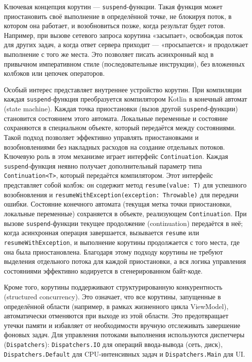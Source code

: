 Ключевая концепция корутин — \texttt{suspend}-функции. Такая функция может приостановить своё выполнение в определённой точке, не блокируя поток, в котором она работает, и возобновиться позже, когда результат будет готов. Например, при вызове сетевого запроса корутина «засыпает», освобождая поток для других задач, а когда ответ сервера приходит — «просыпается» и продолжает выполнение с того же места. Это позволяет писать асинхронный код в привычном императивном стиле (последовательные инструкции), без вложенных колбэков или цепочек операторов.

Особый интерес представляет внутреннее устройство корутин. При компиляции каждая \texttt{suspend}-функция преобразуется компилятором Kotlin в конечный автомат (state machine). Каждая точка приостановки (вызов другой \texttt{suspend}-функции) становится состоянием этого автомата. Локальные переменные и состояние сохраняются в специальном объекте, который передаётся между состояниями. Такой подход позволяет эффективно управлять приостановками и возобновлениями без накладных расходов на создание отдельных потоков. Ключевую роль в этом механизме играет интерфейс \texttt{Continuation}. Каждая \texttt{suspend}-функция неявно получает дополнительный параметр типа \texttt{Continuation<T>}, который передаётся компилятором. Этот интерфейс представляет собой колбэк: он содержит метод \texttt{resume(value: T)} для успешного возобновления и \texttt{resumeWithException(exception: Throwable)} для передачи ошибки. Состояние конечного автомата (текущая метка точки приостановки, локальные переменные) сохраняется в объекте, реализующем \texttt{Continuation}. При вызове \texttt{suspend}-функции текущее продолжение (continuation) передаётся в неё; когда асинхронная операция завершается, вызывается \texttt{resume} или \texttt{resumeWithException}, и выполнение корутины продолжается с того места, где она была приостановлена. Благодаря этому подходу корутины не требуют выделения отдельного потока для каждой приостановки, а вся логика управления состояниями эффективно кодируется в сгенерированном байт-коде.

Кроме того, корутины поддерживают структурированную конкурентность (structured concurrency). Это означает, что все корутины, запущенные в определённой области (например, в рамках жизненного цикла ViewModel), автоматически отменяются при выходе из этой области. Это предотвращает утечки памяти и избавляет от необходимости вручную отслеживать завершение фоновых задач. Для управления потоками выполнения используются диспетчеры (\texttt{Dispatchers}): \texttt{Dispatchers.IO} для операций ввода-вывода (сеть, диск), \texttt{Dispatchers.Default} для CPU-интенсивных задач и \texttt{Dispatchers.Main} для UI.

